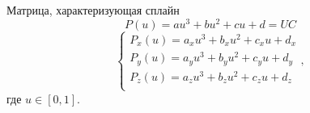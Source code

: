\documentclass{beamer}
\begin{document}
	\begin{frame}{Матрица, характеризующая сплайн}
		\[
			P(u) = a u^3 + b u^2 + c u + d = U C
		\]
		\[
			\begin{cases}
				P_x(u) = a_x u^3 + b_x u^2 + c_x u + d_x \\
				P_y(u) = a_y u^3 + b_y u^2 + c_y u + d_y \\
				P_z(u) = a_z u^3 + b_z u^2 + c_z u + d_z \\
			\end{cases}
			,
		\]
		где 
		$u \in [0,1]$.
		\note{
			\[
			x(u) = 
			\begin{bmatrix}
				u^3 \\
				u^2 \\
				u \\
				1 \\
			\end{bmatrix}^T
			\begin{bmatrix}
				a_x \\
				b_x \\
				c_x \\
				d_x \\
			\end{bmatrix}
			\qquad
			y(u) = 
			\begin{bmatrix}
				u^3 \\
				u^2 \\
				u \\
				1 \\
			\end{bmatrix}^T
			\begin{bmatrix}
				a_y \\
				b_y \\
				c_y \\
				d_y \\
			\end{bmatrix}
			\qquad
			z(u) = 
				\begin{bmatrix}
					u^3 \\
					u^2 \\
					u \\
					1 \\
				\end{bmatrix}^T
				\begin{bmatrix}
					a_z \\
					b_z \\
					c_z \\
					d_z \\
				\end{bmatrix}
			\]


			\[
				P(u) = U C
			\]
			
			

		}
	\end{frame}
\end{document}
